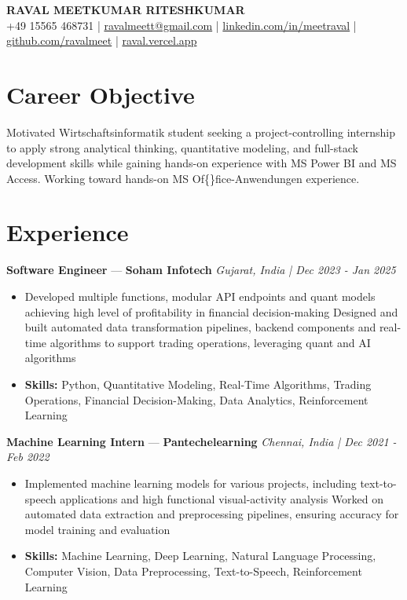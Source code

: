 \documentclass[a4paper,10pt]{article}
\begin{document}
\begin{center}
  {\Large\bfseries RAVAL MEETKUMAR RITESHKUMAR}\\[2pt]
  {\small +49 15565 468731 \;|\; \href{mailto:ravalmeett@gmail.com}{ravalmeett@gmail.com} \;|\; \href{https://www.linkedin.com/in/meetraval/}{linkedin.com/in/meetraval} \;|\; \href{https://github.com/ravalmeet}{github.com/ravalmeet} \;|\; \href{https://raval.vercel.app/}{raval.vercel.app}}
\end{center}
\vspace{-3pt}

\section*{Career Objective}
Motivated Wirtschaftsinformatik student seeking a project-controlling internship to apply strong analytical thinking, quantitative modeling, and full-stack development skills while gaining hands-on experience with MS Power BI and MS Access. Working toward hands-on MS Of\{\}fice-Anwendungen experience.\par

\section*{Experience}
\textbf{Software Engineer} — \textbf{Soham Infotech} \hfill \textit{Gujarat, India \;|\; Dec 2023 - Jan 2025}\par
\vspace{1pt}
\begin{itemize}
  \item Developed multiple functions, modular API endpoints and quant models achieving high level of profitability in financial decision-making Designed and built automated data transformation pipelines, backend components and real-time algorithms to support trading operations, leveraging quant and AI algorithms
  \item \textbf{Skills:} Python, Quantitative Modeling, Real-Time Algorithms, Trading Operations, Financial Decision-Making, Data Analytics, Reinforcement Learning
\end{itemize}
\vspace{3pt}
\textbf{Machine Learning Intern} — \textbf{Pantechelearning} \hfill \textit{Chennai, India \;|\; Dec 2021 - Feb 2022}\par
\vspace{1pt}
\begin{itemize}
  \item Implemented machine learning models for various projects, including text-to-speech applications and high functional visual-activity analysis Worked on automated data extraction and preprocessing pipelines, ensuring accuracy for model training and evaluation
  \item \textbf{Skills:} Machine Learning, Deep Learning, Natural Language Processing, Computer Vision, Data Preprocessing, Text-to-Speech, Reinforcement Learning
\end{itemize}
\end{document}
